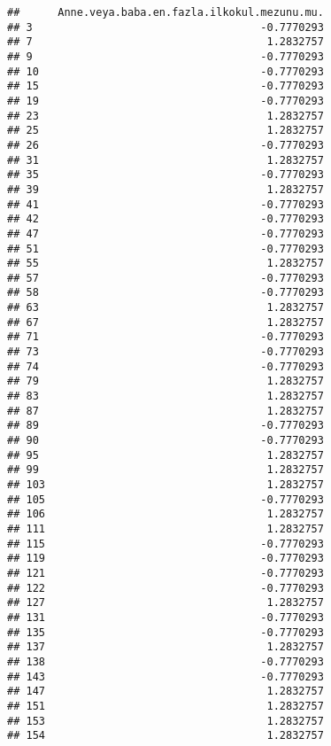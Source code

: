 \documentclass[
]{article}
\begin{document}
\begin{verbatim}
##      Anne.veya.baba.en.fazla.ilkokul.mezunu.mu.
## 3                                    -0.7770293
## 7                                     1.2832757
## 9                                    -0.7770293
## 10                                   -0.7770293
## 15                                   -0.7770293
## 19                                   -0.7770293
## 23                                    1.2832757
## 25                                    1.2832757
## 26                                   -0.7770293
## 31                                    1.2832757
## 35                                   -0.7770293
## 39                                    1.2832757
## 41                                   -0.7770293
## 42                                   -0.7770293
## 47                                   -0.7770293
## 51                                   -0.7770293
## 55                                    1.2832757
## 57                                   -0.7770293
## 58                                   -0.7770293
## 63                                    1.2832757
## 67                                    1.2832757
## 71                                   -0.7770293
## 73                                   -0.7770293
## 74                                   -0.7770293
## 79                                    1.2832757
## 83                                    1.2832757
## 87                                    1.2832757
## 89                                   -0.7770293
## 90                                   -0.7770293
## 95                                    1.2832757
## 99                                    1.2832757
## 103                                   1.2832757
## 105                                  -0.7770293
## 106                                   1.2832757
## 111                                   1.2832757
## 115                                  -0.7770293
## 119                                  -0.7770293
## 121                                  -0.7770293
## 122                                  -0.7770293
## 127                                   1.2832757
## 131                                  -0.7770293
## 135                                  -0.7770293
## 137                                   1.2832757
## 138                                  -0.7770293
## 143                                  -0.7770293
## 147                                   1.2832757
## 151                                   1.2832757
## 153                                   1.2832757
## 154                                   1.2832757

\end{verbatim}
\end{document}
